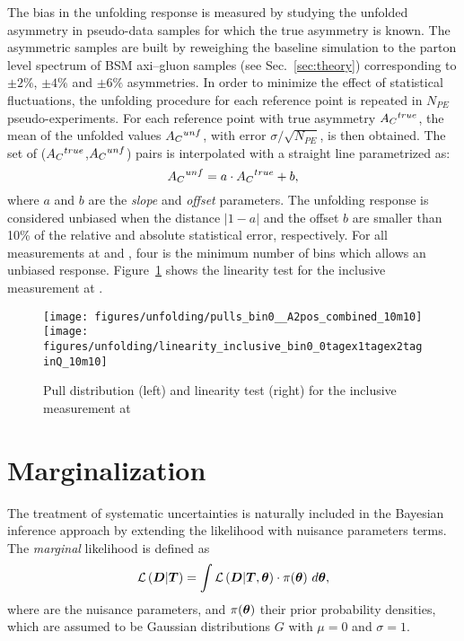 The bias in the unfolding response is measured by studying the
unfolded asymmetry in pseudo-data samples for which the true
asymmetry is known. The asymmetric samples are built by reweighing the
baseline \ttbar{} simulation to the parton level \dy{} spectrum of BSM axi--gluon
samples (see Sec.~\ref{sec:theory}) corresponding to $\pm2\%$, $\pm4\%$
and $\pm6\%$ asymmetries. In order to minimize the effect of
statistical fluctuations, the unfolding procedure for each reference
point is repeated in $N_{PE}$ pseudo-experiments. For each reference
point with true asymmetry $A_C{}^{true}$, the mean of the unfolded
values $A_C{}^{unf}$, with error $\sigma/\sqrt{N_{PE}}$, is then
obtained. The set of ($A_C{}^{true}$,$A_C{}^{unf}$) pairs is
interpolated with a straight line parametrized as: 
\begin{equation}
A_C{}^{unf}=a\cdot{}A_C{}^{true}+b,
\end{equation}
where $a$ and $b$ are the {\it slope} and {\it offset} parameters.
The unfolding response is considered unbiased when the distance
$|1-a|$ and the offset $b$ are smaller than 10\% of the relative and
absolute statistical error, respectively.
For all measurements at \seventev{} and \eighttev{}, four is the
minimum number of bins which allows an unbiased
response. Figure~\ref{fig:pulllinearity} shows the linearity test for
the inclusive \ac{} measurement at \eighttev{}.

\begin{figure}[!htb]\centering
  \texttt{[image: figures/unfolding/pulls\_bin0\_\_A2pos\_combined\_10m10]}
  \texttt{[image: figures/unfolding/linearity\_inclusive\_bin0\_0tagex1tagex2taginQ\_10m10]}
  \caption{Pull distribution (left) and linearity test (right) for the
    inclusive \ac{} measurement at \eighttev{}}
  \label{fig:pulllinearity}
\end{figure}

\section{Marginalization}
\label{sec:marginalization}

The treatment of systematic uncertainties is naturally included in the
Bayesian inference approach by extending the likelihood
\conditionalLhood{\Data{}}{\Truth{}} with nuisance parameters terms.
The {\it marginal} likelihood is defined as
\begin{equation}
  \mathcal{L}\left(\boldsymbol{D}{}|\boldsymbol{T}{}\right)=
  \int
  \mathcal{L}\left(\boldsymbol{D}{}|\boldsymbol{T}{},\boldsymbol{\theta}{}\right) 
  \cdot{} \pi{}(\boldsymbol{\theta}{})
  ~d\boldsymbol{\theta}{},
\end{equation}
where \thetavec{} are the nuisance parameters, and
$\pi{}(\boldsymbol{\theta}{})$ their prior probability densities, which are
assumed to be Gaussian distributions $G$ with $\mu=0$ and $\sigma=1$.

